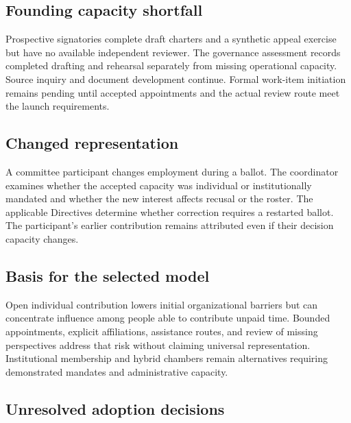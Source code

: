 \documentclass[11pt,a4paper]{article}
\begin{document}
\subsection{Founding capacity shortfall}
Prospective signatories complete draft charters and a synthetic appeal exercise but have no available independent reviewer. The governance assessment records completed drafting and rehearsal separately from missing operational capacity. Source inquiry and document development continue. Formal work-item initiation remains pending until accepted appointments and the actual review route meet the launch requirements.

\subsection{Changed representation}
A committee participant changes employment during a ballot. The coordinator examines whether the accepted capacity was individual or institutionally mandated and whether the new interest affects recusal or the roster. The applicable Directives determine whether correction requires a restarted ballot. The participant's earlier contribution remains attributed even if their decision capacity changes.

\subsection{Basis for the selected model}
Open individual contribution lowers initial organizational barriers but can concentrate influence among people able to contribute unpaid time. Bounded appointments, explicit affiliations, assistance routes, and review of missing perspectives address that risk without claiming universal representation. Institutional membership and hybrid chambers remain alternatives requiring demonstrated mandates and administrative capacity.

\subsection{Unresolved adoption decisions}
\end{document}
